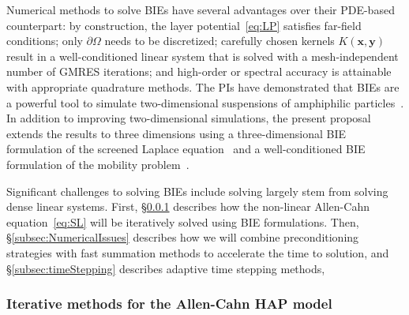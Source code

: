 Numerical methods to solve BIEs have several advantages over their
PDE-based counterpart: by construction, the layer
potential~\eqref{eq:LP} satisfies far-field conditions; only
$\partial\Omega$ needs to be discretized; carefully chosen kernels
$K(\mathbf{x},\mathbf{y})$ result in a well-conditioned linear system
that is solved with a mesh-independent number of GMRES iterations; and
high-order or spectral accuracy is attainable with appropriate
quadrature methods. The PIs have demonstrated that BIEs are a powerful
tool to simulate two-dimensional suspensions of amphiphilic
particles~\cite{Fu2018_SIAM, FuQuRyYo20}. In addition to improving
two-dimensional simulations, the present proposal extends the results to
three dimensions using a three-dimensional BIE formulation of the
screened Laplace equation~\cite{ying_2006} and a well-conditioned BIE
formulation of the mobility problem~\cite{manasthesis, rac-gre2016}.

Significant challenges to solving BIEs include solving largely stem from
solving dense linear systems. First, \S\ref{subsec:AC} describes how the
non-linear Allen-Cahn equation~\eqref{eq:SL} will be iteratively solved
using BIE formulations. Then, \S\ref{subsec:NumericalIssues} describes
how we will combine preconditioning strategies with fast summation
methods to accelerate the time to solution, and
\S\ref{subsec:timeStepping} describes adaptive time stepping methods,

\subsubsection{Iterative methods for the Allen-Cahn HAP model}
\label{subsec:AC}

